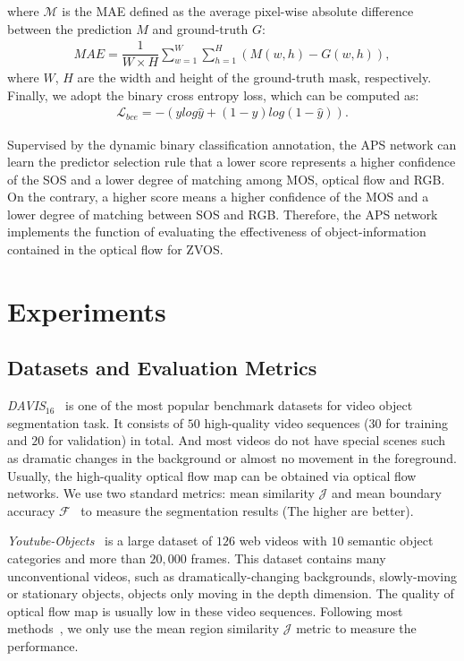 \documentclass[sigconf]{acmart}
\begin{document}
where $\mathcal{M}$ is the MAE defined as the average pixel-wise absolute difference between the prediction $M$ and ground-truth $G$:
	\begin{equation}\label{equ:7}
	\begin{split}
	MAE = \dfrac{1}{W \times H}\sum_{w=1}^W\sum_{h=1}^H(M(w,h)-G(w,h)),
	\end{split} 
	\end{equation}
where 
$W$, $H$ are the width
and height of the ground-truth mask, respectively. 
Finally, we adopt the binary cross entropy loss, which can be computed as:
 \begin{equation}\label{equ:8}
 \begin{split}
    \mathcal{L}_{bce} = -(ylog\hat {y}+(1-y)log(1-\hat{y})).
 \end{split}
\end{equation}

Supervised by the dynamic binary classification annotation, the APS network can learn the predictor selection rule that a lower score represents a higher confidence of the SOS and a lower degree of matching among MOS, optical flow and RGB. On the contrary, a higher score means a higher confidence of the MOS and a lower degree of matching between SOS and RGB. Therefore, the APS network implements the function of evaluating the effectiveness of object-information contained in the optical flow for ZVOS.

\section{Experiments}
\subsection{Datasets and Evaluation Metrics}


\emph{DAVIS$_{16}$}~\cite{davis16} is one of the most popular benchmark datasets for video object segmentation task. It consists of $50$ high-quality video sequences ($30$ for training and $20$ for validation) in total. And most videos do not have special scenes such as dramatic changes in the background or almost no movement in the foreground. Usually, the high-quality optical flow map can be obtained via optical flow networks. We use two standard metrics: mean similarity $\mathcal{J}$ and mean boundary accuracy $\mathcal{F}$~\cite{davis16} to measure the segmentation results (The higher are better). 

\emph{Youtube-Objects}~\cite{youtube-objects} is a large dataset of $126$ web videos with $10$ semantic object categories and more than $20,000$ frames. This dataset contains many unconventional videos, such as dramatically-changing backgrounds, slowly-moving or stationary objects, objects only moving in the depth dimension. The quality of optical flow map is usually low in these video sequences. Following most methods~\cite{MATNet,WCS,AGNN,COSNet,AGS,PDB}, we only use the mean region similarity $\mathcal{J}$ metric to measure the performance. 
\end{document}

